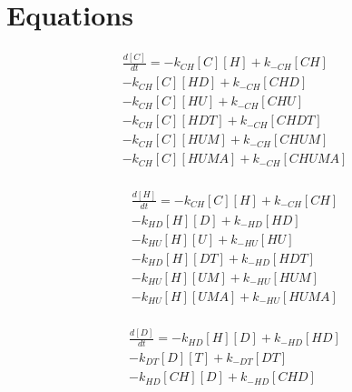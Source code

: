 \section{Equations}

\begin{equation}
\begin{split}
\frac{d[C]}{dt} =     - k_{CH}[C][H]    + k_{-CH}[CH]     \\%
                      - k_{CH}[C][HD]   + k_{-CH}[CHD]    \\%
                      - k_{CH}[C][HU]   + k_{-CH}[CHU]    \\%
                      - k_{CH}[C][HDT]  + k_{-CH}[CHDT]   \\%
                      - k_{CH}[C][HUM]  + k_{-CH}[CHUM]   \\%
                      - k_{CH}[C][HUMA] + k_{-CH}[CHUMA]  \\%
\end{split}
\end{equation}

\begin{equation}
\begin{split}
\frac{d[H]}{dt} =     - k_{CH}[C][H]    + k_{-CH}[CH]     \\%
                      - k_{HD}[H][D]    + k_{-HD}[HD]     \\%
                      - k_{HU}[H][U]    + k_{-HU}[HU]     \\%
                      - k_{HD}[H][DT]   + k_{-HD}[HDT]    \\%
                      - k_{HU}[H][UM]   + k_{-HU}[HUM]    \\%
                      - k_{HU}[H][UMA]  + k_{-HU}[HUMA]   \\%
\end{split}
\end{equation}

\begin{equation}
\begin{split}
\frac{d[D]}{dt} =     - k_{HD}[H][D]    + k_{-HD}[HD]     \\%
                      - k_{DT}[D][T]    + k_{-DT}[DT]     \\%
                      - k_{HD}[CH][D]   + k_{-HD}[CHD]    \\%
\end{split}
\end{equation}

